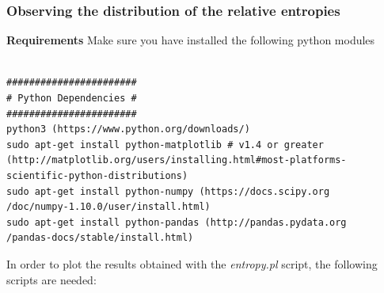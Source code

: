\documentclass[a4paper,11pt]{report}
\begin{document}
\subsubsection{Observing the distribution of the relative entropies}
\textbf{Requirements} 
Make sure you have installed the following python modules 
\begin{verbatim}

#######################
# Python Dependencies #
#######################
python3 (https://www.python.org/downloads/) 
sudo apt-get install python-matplotlib # v1.4 or greater  
(http://matplotlib.org/users/installing.html#most-platforms-
scientific-python-distributions) 
sudo apt-get install python-numpy (https://docs.scipy.org
/doc/numpy-1.10.0/user/install.html) 
sudo apt-get install python-pandas (http://pandas.pydata.org
/pandas-docs/stable/install.html)  
\end{verbatim}

In order to plot the results obtained with the \textit{entropy.pl} script, the following scripts are needed:   
\end{document}

